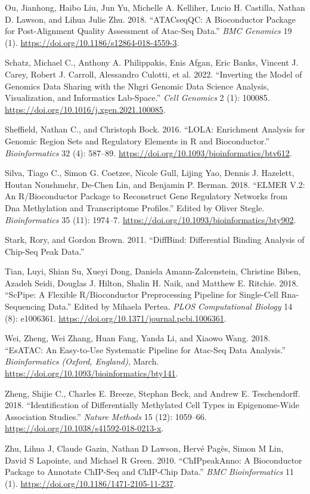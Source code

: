 \begin{cslreferences}
\leavevmode\hypertarget{ref-Ou2018}{}%
Ou, Jianhong, Haibo Liu, Jun Yu, Michelle A. Kelliher, Lucio H. Castilla, Nathan D. Lawson, and Lihua Julie Zhu. 2018. ``ATACseqQC: A Bioconductor Package for Post-Alignment Quality Assessment of Atac-Seq Data.'' \emph{BMC Genomics} 19 (1). \url{https://doi.org/10.1186/s12864-018-4559-3}.

\leavevmode\hypertarget{ref-Schatz2022}{}%
Schatz, Michael C., Anthony A. Philippakis, Enis Afgan, Eric Banks, Vincent J. Carey, Robert J. Carroll, Alessandro Culotti, et al. 2022. ``Inverting the Model of Genomics Data Sharing with the Nhgri Genomic Data Science Analysis, Visualization, and Informatics Lab-Space.'' \emph{Cell Genomics} 2 (1): 100085. \url{https://doi.org/10.1016/j.xgen.2021.100085}.

\leavevmode\hypertarget{ref-Sheffield2016}{}%
Sheffield, Nathan C., and Christoph Bock. 2016. ``LOLA: Enrichment Analysis for Genomic Region Sets and Regulatory Elements in R and Bioconductor.'' \emph{Bioinformatics} 32 (4): 587--89. \url{https://doi.org/10.1093/bioinformatics/btv612}.

\leavevmode\hypertarget{ref-Silva2019}{}%
Silva, Tiago C., Simon G. Coetzee, Nicole Gull, Lijing Yao, Dennis J. Hazelett, Houtan Noushmehr, De-Chen Lin, and Benjamin P. Berman. 2018. ``ELMER V.2: An R/Bioconductor Package to Reconstruct Gene Regulatory Networks from Dna Methylation and Transcriptome Profiles.'' Edited by Oliver Stegle. \emph{Bioinformatics} 35 (11): 1974--7. \url{https://doi.org/10.1093/bioinformatics/bty902}.

\leavevmode\hypertarget{ref-Stark2011}{}%
Stark, Rory, and Gordon Brown. 2011. ``DiffBind: Differential Binding Analysis of Chip-Seq Peak Data.''

\leavevmode\hypertarget{ref-Tian2018}{}%
Tian, Luyi, Shian Su, Xueyi Dong, Daniela Amann-Zalcenstein, Christine Biben, Azadeh Seidi, Douglas J. Hilton, Shalin H. Naik, and Matthew E. Ritchie. 2018. ``ScPipe: A Flexible R/Bioconductor Preprocessing Pipeline for Single-Cell Rna-Sequencing Data.'' Edited by Mihaela Pertea. \emph{PLOS Computational Biology} 14 (8): e1006361. \url{https://doi.org/10.1371/journal.pcbi.1006361}.

\leavevmode\hypertarget{ref-Wei2018}{}%
Wei, Zheng, Wei Zhang, Huan Fang, Yanda Li, and Xiaowo Wang. 2018. ``EsATAC: An Easy-to-Use Systematic Pipeline for Atac-Seq Data Analysis.'' \emph{Bioinformatics (Oxford, England)}, March. \url{https://doi.org/10.1093/bioinformatics/bty141}.

\leavevmode\hypertarget{ref-Zheng2018a}{}%
Zheng, Shijie C., Charles E. Breeze, Stephan Beck, and Andrew E. Teschendorff. 2018. ``Identification of Differentially Methylated Cell Types in Epigenome-Wide Association Studies.'' \emph{Nature Methods} 15 (12): 1059--66. \url{https://doi.org/10.1038/s41592-018-0213-x}.

\leavevmode\hypertarget{ref-Zhu2010}{}%
Zhu, Lihua J, Claude Gazin, Nathan D Lawson, Hervé Pagès, Simon M Lin, David S Lapointe, and Michael R Green. 2010. ``ChIPpeakAnno: A Bioconductor Package to Annotate ChIP-Seq and ChIP-Chip Data.'' \emph{BMC Bioinformatics} 11 (1). \url{https://doi.org/10.1186/1471-2105-11-237}.
\end{cslreferences}



